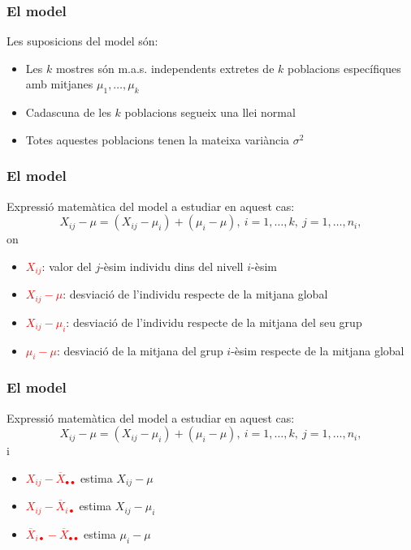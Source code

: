 \documentclass[12pt,t]{beamer}
\newcommand{\red}[1]{\textcolor{red}{#1}}
\renewcommand{\emph}[1]{{\color{red}#1}}
\theoremstyle{plain}
\theoremstyle{definition}
\begin{document}
\begin{frame}
\frametitle{El model}

Les suposicions del model són:
\begin{itemize}
\item Les $k$ mostres són m.a.s. independents
extretes de $k$ poblacions específiques amb mitjanes $\mu_1,\ldots,\mu_k$
\medskip

\item Cadascuna de les $k$ poblacions segueix una llei normal
\medskip

\item Totes aquestes poblacions tenen la mateixa variància $\sigma^2$
\end{itemize}
\end{frame}


\begin{frame}
\frametitle{El model}

\emph{Expressió matemàtica} del model a estudiar en aquest cas:
$$
X_{ij} -\mu=(X_{ij} -\mu_i)+(\mu_i - \mu),\ i=1,\ldots,k,\ j=1,\ldots,n_i,
$$
on
\begin{itemize}
\item \red{$X_{ij}$}: valor del $j$-èsim individu dins del nivell $i$-èsim
\medskip

\item \red{$X_{ij}-\mu$}: desviació de l'individu respecte de la mitjana global
\medskip

\item \red{$X_{ij}-\mu_i$}: desviació de l'individu respecte de la mitjana del seu grup 
\medskip

\item \red{$\mu_i -\mu$}: desviació de la mitjana del grup $i$-èsim respecte de la mitjana global 
\end{itemize}
\end{frame}



\begin{frame}
\frametitle{El model}

\emph{Expressió matemàtica} del model a estudiar en aquest cas:
$$
X_{ij} -\mu=(X_{ij} -\mu_i)+(\mu_i - \mu),\ i=1,\ldots,k,\ j=1,\ldots,n_i,
$$
i
\begin{itemize}
\item \red{$X_{ij}-\overline{X}_{\bullet\bullet}$} estima $X_{ij} - \mu$
\medskip


\item \red{$X_{ij}-\overline{X}_{i\bullet}$} estima $X_{ij} -\mu_i$
\medskip



\item \red{$\overline{X}_{i\bullet}-\overline{X}_{\bullet\bullet}$} estima $\mu_i - \mu$
\end{itemize}
\end{frame}
\end{document}
